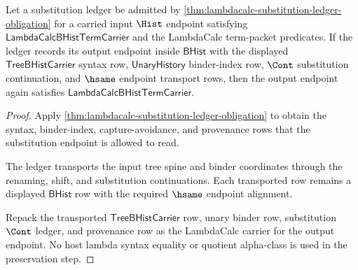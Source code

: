 \begin{theorem}
\label{thm:lambdacalc-substitution-carrier-preservation}
Let a substitution ledger be admitted by
\autoref{thm:lambdacalc-substitution-ledger-obligation} for a carried input
$\Hist$ endpoint satisfying $\mathsf{LambdaCalcBHistTermCarrier}$ and the
LambdaCalc term-packet predicates. If the ledger records its output endpoint
inside $\mathsf{BHist}$ with the displayed $\mathsf{TreeBHistCarrier}$ syntax
row, $\mathsf{UnaryHistory}$ binder-index row, $\Cont$ substitution
continuation, and $\hsame$ endpoint transport rows, then the output endpoint
again satisfies $\mathsf{LambdaCalcBHistTermCarrier}$.
\end{theorem}
\begin{proof}
Apply
\autoref{thm:lambdacalc-substitution-ledger-obligation} to obtain the syntax,
binder-index, capture-avoidance, and provenance rows that the substitution
endpoint is allowed to read.

The ledger transports the input tree spine and binder coordinates through the
renaming, shift, and substitution continuations. Each transported row remains
a displayed $\mathsf{BHist}$ row with the required $\hsame$ endpoint alignment.

Repack the transported $\mathsf{TreeBHistCarrier}$ row, unary binder row,
substitution $\Cont$ ledger, and provenance row as the LambdaCalc carrier for
the output endpoint. No host lambda syntax equality or quotient alpha-class is
used in the preservation step.
\end{proof}

